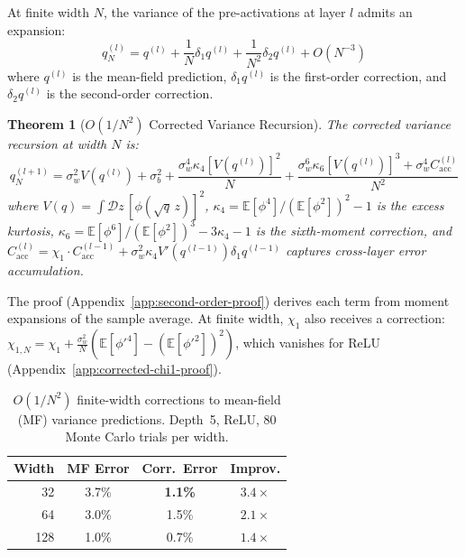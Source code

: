 \documentclass[10pt]{article}
\newcommand{\EE}{\mathbb{E}}
\newtheorem{theorem}{Theorem}
\begin{document}
At finite width $N$, the variance of the pre-activations at layer $l$ admits an expansion:
\begin{equation}
    q_N^{(l)} = q^{(l)} + \frac{1}{N} \delta_1 q^{(l)} + \frac{1}{N^2} \delta_2 q^{(l)} + O(N^{-3})
    \label{eq:finite-width-expansion}
\end{equation}
where $q^{(l)}$ is the mean-field prediction, $\delta_1 q^{(l)}$ is the first-order correction, and $\delta_2 q^{(l)}$ is the second-order correction.

\begin{theorem}[$O(1/N^2)$ Corrected Variance Recursion]
\label{thm:second-order-correction}
The corrected variance recursion at width $N$ is:
\begin{equation}
    q^{(l+1)}_N = \sigma_w^2 V(q^{(l)}) + \sigma_b^2 + \frac{\sigma_w^4 \kappa_4 [V(q^{(l)})]^2}{N} + \frac{\sigma_w^6 \kappa_6 [V(q^{(l)})]^3 + \sigma_w^4 C_{\mathrm{acc}}^{(l)}}{N^2}
    \label{eq:second-order-correction}
\end{equation}
where $V(q) = \int \mathcal{D}z\, [\phi(\sqrt{q}\, z)]^2$, $\kappa_4 = \EE[\phi^4]/(\EE[\phi^2])^2 - 1$ is the excess kurtosis, $\kappa_6 = \EE[\phi^6]/(\EE[\phi^2])^3 - 3\kappa_4 - 1$ is the sixth-moment correction, and $C_{\mathrm{acc}}^{(l)} = \chi_1 \cdot C_{\mathrm{acc}}^{(l-1)} + \sigma_w^2 \kappa_4 V'(q^{(l-1)}) \delta_1 q^{(l-1)}$ captures cross-layer error accumulation.
\end{theorem}

The proof (Appendix~\ref{app:second-order-proof}) derives each term from moment expansions of the sample average.
At finite width, $\chi_1$ also receives a correction: $\chi_{1,N} = \chi_1 + \frac{\sigma_w^2}{N}(\EE[\phi'^4] - (\EE[\phi'^2])^2)$, which vanishes for ReLU (Appendix~\ref{app:corrected-chi1-proof}).

\begin{table}[t]
\centering
\caption{$O(1/N^2)$ finite-width corrections to mean-field (MF) variance predictions. Depth~5, ReLU, 80 Monte Carlo trials per width.}
\label{tab:finite-width}
\small
\begin{tabular}{@{}rccc@{}}
\toprule
\textbf{Width} & \textbf{MF Error} & \textbf{Corr.\ Error} & \textbf{Improv.} \\
\midrule
32   & 3.7\% & \textbf{1.1\%}  & $3.4\times$ \\
64   & 3.0\%  & 1.5\%  & $2.1\times$ \\
128  & 1.0\%  & 0.7\%  & $1.4\times$ \\
\bottomrule
\end{tabular}
\end{table}
\end{document}
